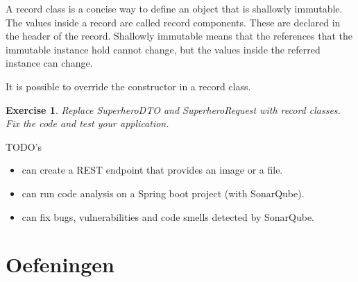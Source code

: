 \documentclass[a4paper, 12pt]{report}
\newenvironment{boxexercise}
{\begin{tcolorbox}
[enhanced jigsaw,breakable,pad at break*=1mm,
 colback=tsyellow!20,boxrule=0pt,frame hidden]}
{\end{tcolorbox}}
\newtheorem{envoefening}{\textbf{Exercise}}[chapter]
\newenvironment{oefening}
               {\begin{boxexercise}\begin{envoefening}}
               {\end{envoefening}\end{boxexercise}}
\begin{document}
A record class is a concise way to define an object that is shallowly immutable. The values inside a record are called record components. These are declared in the header of the record. Shallowly immutable means that the references that the immutable instance hold cannot change, but the values inside the referred instance can change.

It is possible to override the constructor in a record class.

\begin{oefening}
Replace SuperheroDTO and SuperheroRequest with record classes. Fix the code and test your application.
\end{oefening}
  



















TODO's

\begin{itemize}
\item can create a REST endpoint that provides an image or a file.
\item can run code analysis on a Spring boot project (with SonarQube).
\item can fix bugs, vulnerabilities and code smells detected by SonarQube.
\end{itemize}



\section{Oefeningen}
\end{document}
